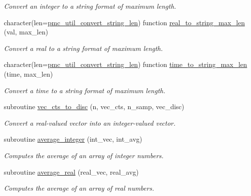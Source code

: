 \begin{DoxyCompactItemize}
\begin{DoxyCompactList}\small\item\em Convert an integer to a string format of maximum length. \end{DoxyCompactList}\item 
character(len=\mbox{\hyperlink{namespacepmc__util_afd468d26aef28509c08087ba8e59089a}{pmc\+\_\+util\+\_\+convert\+\_\+string\+\_\+len}}) function \mbox{\hyperlink{namespacepmc__util_a25918c31f5ac5a5497993883e1206308}{real\+\_\+to\+\_\+string\+\_\+max\+\_\+len}} (val, max\+\_\+len)
\begin{DoxyCompactList}\small\item\em Convert a real to a string format of maximum length. \end{DoxyCompactList}\item 
character(len=\mbox{\hyperlink{namespacepmc__util_afd468d26aef28509c08087ba8e59089a}{pmc\+\_\+util\+\_\+convert\+\_\+string\+\_\+len}}) function \mbox{\hyperlink{namespacepmc__util_aa8c823006029e4a59872cb3f1e14bc70}{time\+\_\+to\+\_\+string\+\_\+max\+\_\+len}} (time, max\+\_\+len)
\begin{DoxyCompactList}\small\item\em Convert a time to a string format of maximum length. \end{DoxyCompactList}\item 
subroutine \mbox{\hyperlink{namespacepmc__util_a90ce2db27a1927738cbef385c5f6decb}{vec\+\_\+cts\+\_\+to\+\_\+disc}} (n, vec\+\_\+cts, n\+\_\+samp, vec\+\_\+disc)
\begin{DoxyCompactList}\small\item\em Convert a real-\/valued vector into an integer-\/valued vector. \end{DoxyCompactList}\item 
subroutine \mbox{\hyperlink{namespacepmc__util_a48e55ceb55e57898081b2b0221caa856}{average\+\_\+integer}} (int\+\_\+vec, int\+\_\+avg)
\begin{DoxyCompactList}\small\item\em Computes the average of an array of integer numbers. \end{DoxyCompactList}\item 
subroutine \mbox{\hyperlink{namespacepmc__util_a5659f4d2fd9c274756e737639dc30196}{average\+\_\+real}} (real\+\_\+vec, real\+\_\+avg)
\begin{DoxyCompactList}\small\item\em Computes the average of an array of real numbers. \end{DoxyCompactList}\item 

\end{DoxyCompactItemize}
